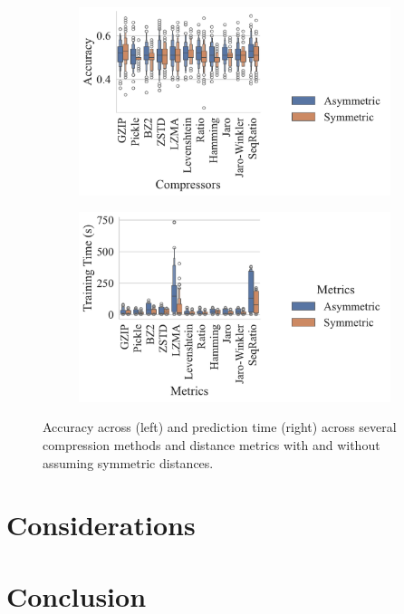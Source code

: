 \documentclass[sigconf]{acmart}
\begin{document}
\begin{figure}
    \begin{subfigure}
        \centering
        \includegraphics[width=.36\textwidth]{figs/truthseeker/symmetric_vs_metric.pdf}
    \end{subfigure}
    \begin{subfigure}
        \centering
        \includegraphics[width=.36\textwidth]{figs/truthseeker/symmetric_vs_metric_train_time.pdf}
    \end{subfigure}
    \caption{Accuracy across (left) and prediction time (right) across several compression methods and distance metrics with and without assuming symmetric distances.}
    \label{fig:symmetry}
\end{figure}

\label{results}
\section{Considerations}
\label{considerations}
\section{Conclusion}
\label{conclusion}



\clearpage

\end{document}
